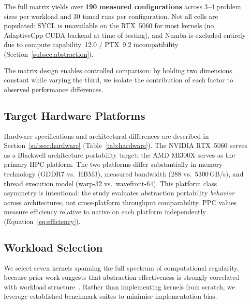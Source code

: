 The full matrix yields over \textbf{190 measured configurations} across 3--4
problem sizes per workload and 30 timed runs per configuration. Not all cells
are populated: SYCL is unavailable on the RTX~5060 for most kernels (no
AdaptiveCpp CUDA backend at time of testing), and Numba is excluded entirely
due to compute capability~12.0 / PTX~9.2 incompatibility
(Section~\ref{subsec:abstraction}).

The matrix design enables controlled comparison: by holding two dimensions
constant while varying the third, we isolate the contribution of each factor
to observed performance differences.

\subsection{Target Hardware Platforms}
\label{subsec:hw-method}

Hardware specifications and architectural differences are described in
Section~\ref{subsec:hardware} (Table~\ref{tab:hardware}). The NVIDIA RTX~5060
serves as a Blackwell architecture portability target; the AMD MI300X serves as
the primary HPC platform. The two platforms differ substantially in memory
technology (GDDR7 vs.\ HBM3), measured bandwidth (288 vs.\ 5300\,GB/s), and
thread execution model (warp-32 vs.\ wavefront-64). This platform class
asymmetry is intentional: the study evaluates abstraction portability
\emph{behavior} across architectures, not cross-platform throughput
comparability. PPC values measure efficiency relative to native on each
platform independently (Equation~\ref{eq:efficiency}).

\subsection{Workload Selection}
\label{subsec:workloads}

We select seven kernels spanning the full spectrum of computational regularity,
because prior work suggests that abstraction effectiveness is strongly
correlated with workload structure~\cite{Godoy2023, Evans2022}. Rather than
implementing kernels from scratch, we leverage established benchmark suites to
minimise implementation bias.

